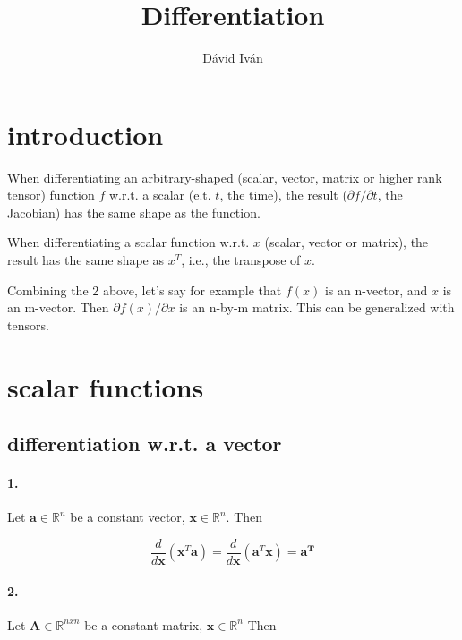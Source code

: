 \documentclass{article}
\title{Differentiation}
\author{Dávid Iván}
\begin{document}
\maketitle

\tableofcontents

\newpage

\section{introduction}

When differentiating an arbitrary-shaped (scalar, vector, matrix or higher rank tensor) function $f$ w.r.t. a scalar (e.t. $t$, the time), the result ($\partial f / \partial t$, the Jacobian) has the same shape as the function.

When differentiating a scalar function w.r.t. $x$ (scalar, vector or matrix), the result has the same shape as $x^T$, i.e., the transpose of $x$.

Combining the 2 above, let's say for example that $f(x)$ is an n-vector, and $x$ is an m-vector. Then $\partial f(x) / \partial x$ is an n-by-m matrix. This can be generalized with tensors.

\section{scalar functions}

\subsection{differentiation w.r.t. a vector}

\paragraph{1.} Let $\mathbf{a} \in \mathbb{R}^n$ be a constant vector, $\mathbf{x} \in \mathbb{R}^n$. Then

\begin{equation} \label{eq:da_dx}
    \frac{d}{d\mathbf{x}} (\mathbf{x}^{T}\mathbf{a}) = \frac{d}{d\mathbf{x}} (\mathbf{a}^{T}\mathbf{x}) = \mathbf{a^T}
\end{equation}

\paragraph{2.} Let $\mathbf{A} \in \mathbb{R}^{nxn}$ be a constant matrix, $\mathbf{x} \in \mathbb{R}^n$ Then
\end{document}

